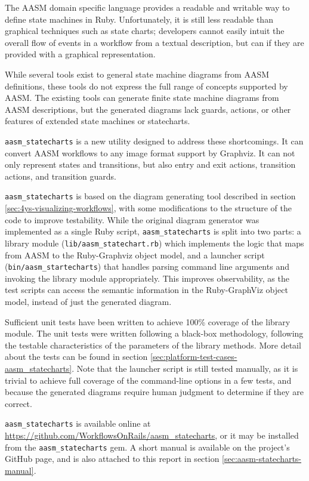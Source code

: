 \documentclass[document.tex]{subfiles}
\begin{document}
The AASM domain specific language provides a readable and writable way to define state machines in Ruby. Unfortunately, it is still less readable than graphical techniques such as state charts; developers cannot easily intuit the overall flow of events in a workflow from a textual description, but can if they are provided with a graphical representation.

While several tools exist to general state machine diagrams from AASM definitions, these tools do not express the full range of concepts supported by AASM. The existing tools can generate finite state machine diagrams from AASM descriptions, but the generated diagrams lack guards, actions, or other features of extended state machines or statecharts.

\verb!aasm_statecharts! \cite{aasm_statecharts} is a new utility designed to address these shortcomings. It can convert AASM workflows to any image format support by Graphviz. It can not only represent states and transitions, but also entry and exit actions, transition actions, and transition guards.

\verb!aasm_statecharts! is based on the diagram generating tool described in section \ref{sec:4ys-visualizing-workflows}, with some modifications to the structure of the code to improve testability. While the original diagram generator was implemented as a single Ruby script, \verb!aasm_statecharts! is split into two parts: a library module (\verb!lib/aasm_statechart.rb!) which implements the logic that maps from AASM to the Ruby-Graphviz object model, and a launcher script (\verb!bin/aasm_startecharts!) that handles parsing command line arguments and invoking the library module appropriately. This improves observability, as the test scripts can access the semantic information in the Ruby-GraphViz object model, instead of just the generated diagram.

Sufficient unit tests have been written to achieve 100\% coverage of the library module. The unit tests were written following a black-box methodology, following the testable characteristics of the parameters of the library methods. More detail about the tests can be found in section \ref{sec:platform-test-cases-aasm_statecharts}. Note that the launcher script is still tested manually, as it is trivial to achieve full coverage of the command-line options in a few tests, and because the generated diagrams require human judgment to determine if they are correct.

\verb!aasm_statecharts! is available online at \url{https://github.com/WorkflowsOnRails/aasm_statecharts}, or it may be installed from the \verb!aasm_statecharts! gem.
A short manual is available on the project's GitHub page, and is also attached to this report in section \ref{sec:aasm-statecharts-manual}.
\end{document}
